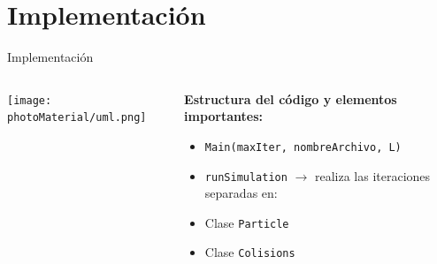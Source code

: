 \documentclass{beamer}
\begin{document}
\section{Implementación}
\begin{frame}{Implementación}
  \begin{columns}
    \begin{column}{0.4\textwidth}
      {\scriptsize
        \begin{center}
          \texttt{[image: photoMaterial/uml.png]}
        \end{center}
      }
    \end{column}
    \begin{column}{0.6\textwidth}
      {\scriptsize
        \textbf{Estructura del código y elementos importantes:}
        \begin{itemize}
          \item \texttt{Main(maxIter, nombreArchivo, L)}
          \item \texttt{runSimulation} $\rightarrow$ realiza las iteraciones separadas en:
          \item Clase \texttt{Particle}
          \item Clase \texttt{Colisions}
        \end{itemize}
      }
    \end{column}
  \end{columns}
\end{frame}
\end{document}
